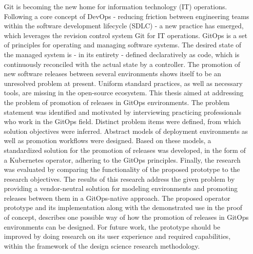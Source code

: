 Git is becoming the new home for information technology (IT) operations.
Following a core concept of DevOps
- reducing friction between engineering teams within the software development lifecycle (SDLC) -
a new practice has emerged,
which leverages the revision control system Git for IT operations.
GitOps is a set of principles for operating and managing software systems.
The desired state of the managed system is
- in its entirety -
defined declaratively as code,
which is continuously reconciled with the actual state by a controller.
The promotion of new software releases between several environments
shows itself to be an unresolved problem at present.
Uniform standard practices, as well as necessary tools, are missing in the open-source ecosystem.
This thesis aimed at addressing the problem of
promotion of releases in GitOps environments.
The problem statement was identified and motivated by
interviewing practicing professionals who work in the GitOps field.
Distinct problem items were defined, from which solution objectives were inferred.
Abstract models of deployment environments as well as promotion workflows
were designed.
Based on these models,
a standardized solution for the promotion of releases
was developed,
in the form of a Kubernetes operator,
adhering to the GitOps principles.
Finally, the research was evaluated by
comparing the functionality of the proposed prototype
to the research objectives.
The results of this research
address the given problem
by providing a vendor-neutral solution
for modeling environments and promoting releases between them
in a GitOps-native approach.
The proposed operator prototype and its implementation along with
the demonstrated use in the proof of concept,
describes one possible way of how the promotion of releases
in GitOps environments can be designed.
For future work, the prototype should be improved
by doing research on its user experience and required capabilities,
within the framework of
the design science research methodology.























